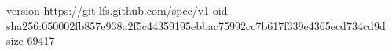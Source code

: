version https://git-lfs.github.com/spec/v1
oid sha256:050002fb857e938a2f5c44359195ebbac75992cc7b617f339e4365ecd734cd9d
size 69417
